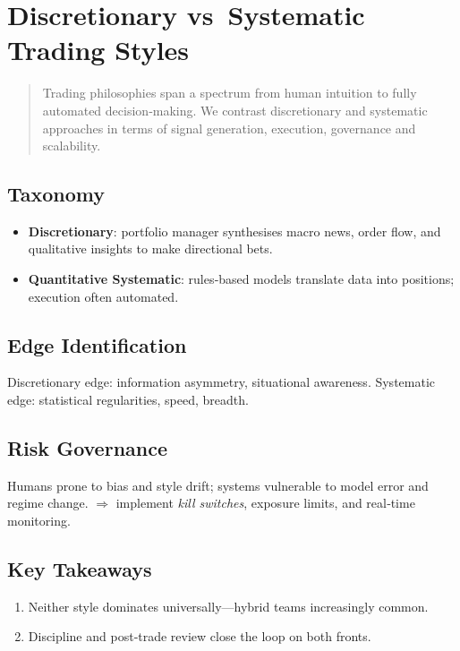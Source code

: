 \chapter{Discretionary vs Systematic Trading Styles}\label{ch:discvsyst}

\begin{abstract}
Trading philosophies span a spectrum from human intuition to fully
automated decision‐making.  We contrast discretionary and systematic
approaches in terms of signal generation, execution, governance and
scalability.
\end{abstract}

\section{Taxonomy}

\begin{itemize}
  \item \textbf{Discretionary}: portfolio manager synthesises macro news,
        order flow, and qualitative insights to make directional bets.
  \item \textbf{Quantitative Systematic}: rules‐based models translate
        data into positions; execution often automated.
\end{itemize}

\section{Edge Identification}

Discretionary edge: information asymmetry, situational awareness.  
Systematic edge: statistical regularities, speed, breadth.

\section{Risk Governance}

Humans prone to bias and style drift; systems vulnerable to model error
and regime change.  
\(\Rightarrow\) implement \emph{kill switches}, exposure limits,
and real‑time monitoring.

\section*{Key Takeaways}

\begin{enumerate}
  \item Neither style dominates universally—hybrid teams increasingly common.
  \item Discipline and post‑trade review close the loop on both fronts.
\end{enumerate}
